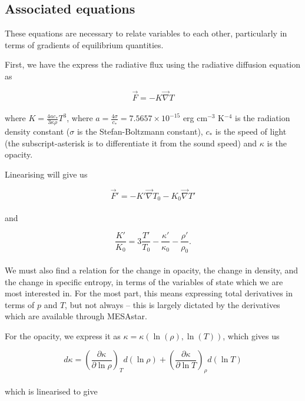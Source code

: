 \documentclass[11pt]{amsart}
\begin{document}
\subsection{Associated equations}

These equations are necessary to relate variables to each other, particularly in terms of gradients of
equilibrium quantities.

First, we have the express the radiative flux using the radiative diffusion equation as

\begin{equation}
\vec{F} = - K \vec{\nabla} T
\end{equation}
\\
where $K = \frac{4 a c_{*}}{3 \kappa \rho} T^{3}$, where $a = \frac{4 \sigma}{c_{*}} = 7.5657 \times 10^{-15}$ 
erg cm$^{-3}$ K$^{-4}$ is the radiation density constant ($\sigma$ is the Stefan-Boltzmann constant),
$c_{*}$ is the speed of light (the subscript-asterisk is to differentiate it from the sound speed) 
and $\kappa$ is the opacity.

Linearising will give us

\begin{equation}
\vec{F}' = - K' \vec{\nabla} T_{0} - K_{0} \vec{\nabla} T'
\end{equation}
\\
and

\begin{equation}
\frac{K'}{K_{0}} = 3 \frac{T'}{T_{0}} - \frac{\kappa'}{\kappa_{0}} - \frac{\rho'}{\rho_{0}}.
\end{equation}
\\

We must also find a relation for the change in opacity, the change in density, and the change in specific entropy,
in terms of the variables of state which we are most interested in.  For the most part, this
means expressing total derivatives in terms of $p$ and $T$, but not always -- this is largely
dictated by the derivatives which are available through MESAstar.

For the opacity, we express it as $\kappa = \kappa \left( \ln (\rho) , \ln(T) \right)$, which gives us

\begin{equation}
d\kappa = \left( \frac{\partial \kappa}{\partial \ln \rho} \right)_{T} d(\ln \rho) + \left( \frac{\partial \kappa}{\partial \ln T} \right)_{\rho} d(\ln T)
\end{equation}
\\
which is linearised to give
\end{document}
